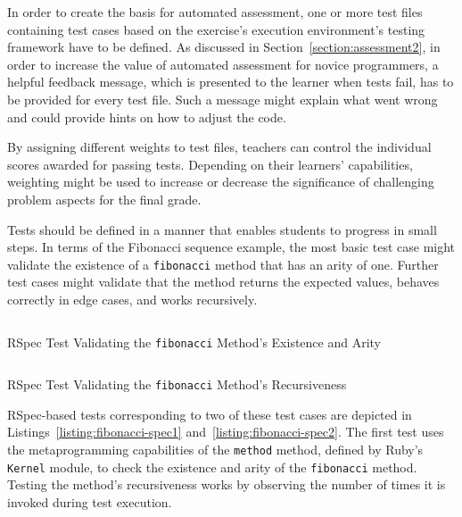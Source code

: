 In order to create the basis for automated assessment, one or more test files containing test cases based on the exercise's execution environment's testing framework have to be defined. As discussed in Section~\ref{section:assessment2}, in order to increase the value of automated assessment for novice programmers, a helpful feedback message, which is presented to the learner when tests fail, has to be provided for every test file. Such a message might explain what went wrong and could provide hints on how to adjust the code.

By assigning different weights to test files, teachers can control the individual scores awarded for passing tests. Depending on their learners' capabilities, weighting might be used to increase or decrease the significance of challenging problem aspects for the final grade.

Tests should be defined in a manner that enables students to progress in small steps. In terms of the Fibonacci sequence example, the most basic test case might validate the existence of a \texttt{fibonacci} method that has an arity of one. Further test cases might validate that the method returns the expected values, behaves correctly in edge cases, and works recursively.

\begin{listing}
\inputminted[frame=lines]{rb}{listings/exercise_spec_1.rb}
\vspace{-0.33cm}
\caption{RSpec Test Validating the \texttt{fibonacci} Method’s Existence and Arity}
\label{listing:fibonacci-spec1}
\end{listing}

\begin{listing}
\inputminted[frame=lines]{rb}{listings/exercise_spec_2.rb}
\vspace{-0.33cm}
\caption{RSpec Test Validating the \texttt{fibonacci} Method’s Recursiveness}
\label{listing:fibonacci-spec2}
\end{listing}

RSpec-based tests corresponding to two of these test cases are depicted in Listings~\ref{listing:fibonacci-spec1} and~\ref{listing:fibonacci-spec2}. The first test uses the metaprogramming capabilities of the \texttt{method} method, defined by Ruby's \texttt{Kernel} module, to check the existence and arity of the \texttt{fibonacci} method. Testing the method's recursiveness works by observing the number of times it is invoked during test execution.

